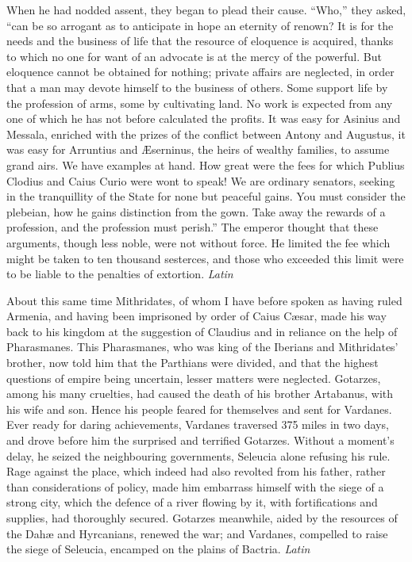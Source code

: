 
When he had nodded assent, they began to plead their cause. ``Who,'' they asked, ``can be so arrogant as to anticipate in hope an eternity of renown? It is for the needs and the business of life that the resource of eloquence is acquired, thanks to which no one for want of an advocate is at the mercy of the powerful. But eloquence cannot be obtained for nothing; private affairs are neglected, in order that a man may devote himself to the business of others. Some support life by the profession of arms, some by cultivating land. No work is expected from any one of which he has not before calculated the profits. It was easy for Asinius and Messala, enriched with the prizes of the conflict between Antony and Augustus, it was easy for Arruntius and Æserninus, the heirs of wealthy families, to assume grand airs. We have examples at hand. How great were the fees for which Publius Clodius and Caius Curio were wont to speak! We are ordinary senators, seeking in the tranquillity of the State for none but peaceful gains. You must consider the plebeian, how he gains distinction from the gown. Take away the rewards of a profession, and the profession must perish.'' The emperor thought that these arguments, though less noble, were not without force. He limited the fee which might be taken to ten thousand sesterces, and those who exceeded this limit were to be liable to the penalties of extortion. \emph{Latin}


About this same time Mithridates, of whom I have before spoken as having ruled Armenia, and having been imprisoned by order of Caius Cæsar, made his way back to his kingdom at the suggestion of Claudius and in reliance on the help of Pharasmanes. This Pharasmanes, who was king of the Iberians and Mithridates' brother, now told him that the Parthians were divided, and that the highest questions of empire being uncertain, lesser matters were neglected. Gotarzes, among his many cruelties, had caused the death of his brother Artabanus, with his wife and son. Hence his people feared for themselves and sent for Vardanes. Ever ready for daring achievements, Vardanes traversed 375 miles in two days, and drove before him the surprised and terrified Gotarzes. Without a moment's delay, he seized the neighbouring governments, Seleucia alone refusing his rule. Rage against the place, which indeed had also revolted from his father, rather than considerations of policy, made him embarrass himself with the siege of a strong city, which the defence of a river flowing by it, with fortifications and supplies, had thoroughly secured. Gotarzes meanwhile, aided by the resources of the Dahæ and Hyrcanians, renewed the war; and Vardanes, compelled to raise the siege of Seleucia, encamped on the plains of Bactria. \emph{Latin}

